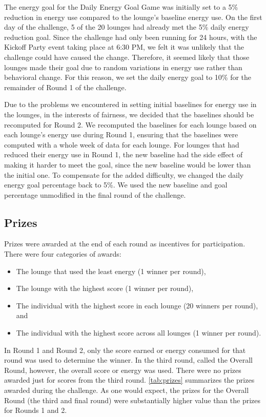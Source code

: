 The energy goal for the Daily Energy Goal Game was initially set to a 5\% reduction in energy use compared to the lounge's baseline energy use. On the first day of the challenge, 5 of the 20 lounges had already met the 5\% daily energy reduction goal. Since the challenge had only been running for 24 hours, with the Kickoff Party event taking place at 6:30 PM, we felt it was unlikely that the challenge could have caused the change. Therefore, it seemed likely that those lounges made their goal due to random variations in energy use rather than behavioral change. For this reason, we set the daily energy goal to 10\% for the remainder of Round 1 of the challenge.

Due to the problems we encountered in setting initial baselines for energy use in the lounges, in the interests of fairness, we decided that the baselines should be recomputed for Round 2. We recomputed the baselines for each lounge based on each lounge's energy use during Round 1, ensuring that the baselines were computed with a whole week of data for each lounge. For lounges that had reduced their energy use in Round 1, the new baseline had the side effect of making it harder to meet the goal, since the new baseline would be lower than the initial one. To compensate for the added difficulty, we changed the daily energy goal percentage back to 5\%. We used the new baseline and goal percentage unmodified in the final round of the challenge.


\subsection{Prizes}
\label{sec:prizes}

Prizes were awarded at the end of each round as incentives for participation. There were four categories of awards:

\begin{itemize}
	\item The lounge that used the least energy (1 winner per round),
	\item The lounge with the highest score (1 winner per round),
	\item The individual with the highest score in each lounge (20 winners per round), and
	\item The individual with the highest score across all lounges (1 winner per round).
\end{itemize}

In Round 1 and Round 2, only the score earned or energy consumed for that round was used to determine the winner. In the third round, called the Overall Round, however, the overall score or energy was used. There were no prizes awarded just for scores from the third round. \autoref{tab:prizes} summarizes the prizes awarded during the challenge. As one would expect, the prizes for the Overall Round (the third and final round) were substantially higher value than the prizes for Rounds 1 and 2.

